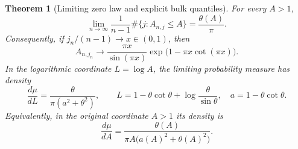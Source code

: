\documentclass[11pt]{article}
\numberwithin{equation}{section}
\newtheorem{theorem}{Theorem}[section]
\theoremstyle{definition}
\theoremstyle{remark}
\begin{document}
\begin{theorem}[Limiting zero law and explicit bulk quantiles]
\label{thm:velocity-zero-law}
For every $A>1$,
\begin{equation}\label{eq:zero-law-cdf}
 \lim_{n\to\infty}\frac1{n-1}
       \#\{j:A_{n,j}\leq A\}=\frac{\theta(A)}\pi.
\end{equation}
Consequently, if $j_n/(n-1)\to x\in(0,1)$, then
\begin{equation}\label{eq:zero-law-quantile}
 A_{n,j_n}\longrightarrow
 \frac{\pi x}{\sin(\pi x)}\exp\bigl(1-\pi x\cot(\pi x)\bigr).
\end{equation}
In the logarithmic coordinate $L=\log A$, the limiting probability
measure has density
\begin{equation}\label{eq:zero-law-density}
 \frac{d\mu}{dL}
   =\frac{\theta}{\pi(a^2+\theta^2)},\qquad
 L=1-\theta\cot\theta+\log\frac\theta{\sin\theta},
 \quad a=1-\theta\cot\theta.
\end{equation}
Equivalently, in the original coordinate $A>1$ its density is
\begin{equation}\label{eq:zero-law-density-A}
 \frac{d\mu}{dA}=\frac{\theta(A)}
              {\pi A\bigl(a(A)^2+\theta(A)^2\bigr)}.
\end{equation}
\end{theorem}
\end{document}
